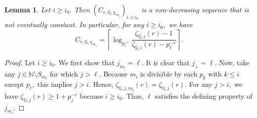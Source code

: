 \documentclass[12pt]{amsart}
\newtheorem{lemma}[theorem]{Lemma}
\theoremstyle{definition}
\numberwithin{equation}{section}
\newcommand{\Q}{\mathbb{Q}}
\begin{document}
\begin{lemma} \label{rangeClemma}
    Let $i \geq i_0.$ Then $(C_{r,\Q,\chi_{m_i}})_{i \geq i_0}$ is a non-decreasing sequence that is not eventually constant. In particular, for any $i \geq i_0,$ we have $$C_{r,\Q,\chi_{m_i}} = \left \lceil \log_{p_\ell^{-r}} \frac{\zeta_{\Q,i}(r)-1}{\zeta_{\Q,i}(r) - p_\ell^{-r}} \right \rceil.$$
\end{lemma}


\begin{proof}
    Let $i \geq i_0.$ We first show that $j_{m_i} = \ell.$ It is clear that $j_+ = \ell.$ Now, take any $j \in \mathbb N \setminus S_{m_i}$ for which $j > \ell.$ Because $m_i$ is divisible by each $p_k$ with $k \leq i$ except $p_\ell,$ this implies $j > i.$ Hence, $\zeta_{\Q, j , m_i}(r) = \zeta_{\Q,j}(r).$ For any $j  > i,$ we have $\zeta_{\Q,j}(r) \geq 1 + p_j^{-r}$ because $i \geq i_0.$ Thus, $\ell$ satisfies the defining property of $j_{m_i}.$ 


\end{proof}
\end{document}
